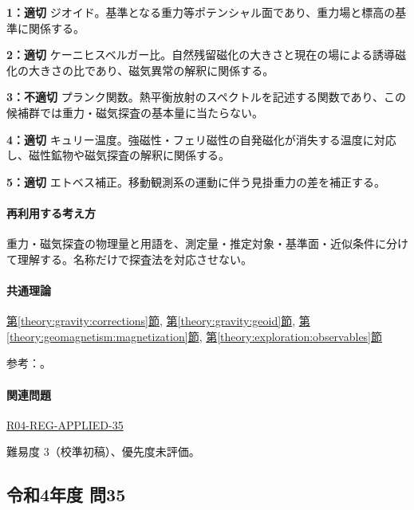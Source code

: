 \noindent\textbf{1：適切} ジオイド。基準となる重力等ポテンシャル面であり、重力場と標高の基準に関係する。\par

\noindent\textbf{2：適切} ケーニヒスベルガー比。自然残留磁化の大きさと現在の場による誘導磁化の大きさの比であり、磁気異常の解釈に関係する。\par

\noindent\textbf{3：不適切} プランク関数。熱平衡放射のスペクトルを記述する関数であり、この候補群では重力・磁気探査の基本量に当たらない。\par

\noindent\textbf{4：適切} キュリー温度。強磁性・フェリ磁性の自発磁化が消失する温度に対応し、磁性鉱物や磁気探査の解釈に関係する。\par

\noindent\textbf{5：適切} エトベス補正。移動観測系の運動に伴う見掛重力の差を補正する。\par

\paragraph{再利用する考え方} 重力・磁気探査の物理量と用語を、測定量・推定対象・基準面・近似条件に分けて理解する。名称だけで探査法を対応させない。

\paragraph{共通理論} \hyperref[theory:gravity:corrections]{第\ref*{theory:gravity:corrections}節}, \hyperref[theory:gravity:geoid]{第\ref*{theory:gravity:geoid}節}, \hyperref[theory:geomagnetism:magnetization]{第\ref*{theory:geomagnetism:magnetization}節}, \hyperref[theory:exploration:observables]{第\ref*{theory:exploration:observables}節}

\par 参考：\cite{gsi_gravity_definitions,kanaya_okuma2011}。

\paragraph{関連問題} \hyperref[q:r04-reg-applied-35]{R04-REG-APPLIED-35}

\par 難易度 3（校準初稿）、優先度未評価。

\subsection{令和4年度 問35}
\label{q:r04-reg-applied-35}

